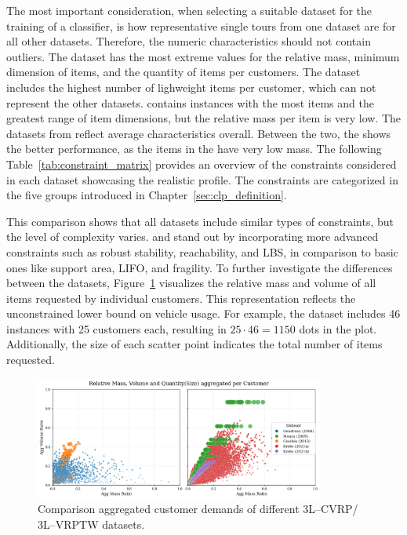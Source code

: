 

The most important consideration, when selecting a suitable dataset for the training of a classifier,
is how representative single tours from one dataset are for all other datasets. Therefore, the numeric characteristics
should not contain outliers. The \gendreauDataSetText dataset has the most extreme values for the relative mass, minimum dimension of items,
and the quantity of items per customers. The \mouraDataSetText dataset includes the highest number of lighweight items per customer,
which can not represent the other datasets. \ceschiaDataSetText contains instances with the most items and the greatest range
of item dimensions, but the relative mass per item is very low. The datasets from \citeauthor*{krebs_advanced_2021}
reflect average characteristics overall. Between the two, the \krebsADataSetText shows the better performance,
as the items in the \krebsBDataSetText have very low mass.
The following Table~\ref{tab:constraint_matrix} provides an overview of the constraints considered
in each dataset showcasing the realistic profile. The constraints are categorized in the five groups introduced
in Chapter~\ref{sec:clp_definition}.
\clearpage


This comparison shows that all datasets include similar types of constraints, but the level
of complexity varies. \krebsADataSetText and \ceschiaDataSetText stand out by incorporating
more advanced constraints such as robust stability, reachability, and \gls{LBS}, in comparison to
basic ones like support area, \gls{LIFO}, and fragility. To further investigate the differences
between the datasets, Figure~\ref{fig:dataset_comparison} visualizes the relative mass and
volume of all items requested by individual customers. This representation reflects the
unconstrained lower bound on vehicle usage. For example, the \mouraDataSetText dataset includes 46
instances with 25 customers each, resulting in $25 \cdot 46 = 1150$ dots in the plot.
Additionally, the size of each scatter point indicates the total number of items requested.

\begin{figure}[ht]
    \centering
    \includegraphics[width=0.85\textwidth]{pictures/comparison_datasets_3lcvrp.png}
    \caption{Comparison aggregated customer demands of different 3L--CVRP/ 3L--VRPTW datasets.}
    \label{fig:dataset_comparison}
\end{figure}

